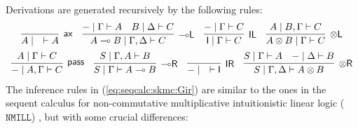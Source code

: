 \documentclass[sn-mathphys-num]{sn-jnl}%
\newcommand{\vd}{\vdash}
\newcommand{\tl}{\otimes \mathsf{L}}
\newcommand{\tr}{\otimes\mathsf{R}}
\newcommand{\pass}{\mathsf{pass}}
\newcommand{\unitl}{\mathsf{IL}}
\newcommand{\unitr}{\mathsf{IR}}
\newcommand{\ax}{\mathsf{ax}}
\newcommand{\ot}{\otimes}
\newcommand{\lolli}{\multimap}
\newcommand{\lleft}{{\lolli}\mathsf{L}}
\newcommand{\lright}{{\lolli}\mathsf{R}}
\newcommand{\unit}{\mathsf{I}}
\newcommand{\NMILL}{$\mathtt{NMILL}$}
\theoremstyle{thmstyleone}%
\theoremstyle{thmstyletwo}%
\theoremstyle{thmstylethree}%
\begin{document}
Derivations are generated recursively by the following rules:
\begin{equation}\label{eq:seqcalc:skmc:Gir}
	  \begin{array}{c}
		\infer[\ax]{A \mid \quad \vd A}{}
		\quad
		\infer[\lleft]{A \lolli B \mid \Gamma , \Delta \vd C}{
		  {-} \mid \Gamma \vd A
		  &
		  B \mid \Delta \vd C
		}
		\quad
		\infer[\unitl]{\unit \mid \Gamma \vd C}{{-} \mid \Gamma \vd C}
		\quad
		\infer[\tl]{A \ot B \mid \Gamma \vd C}{A \mid B , \Gamma \vd C}
		\\[5pt]
    \infer[\pass]{{-} \mid A , \Gamma \vd C}{A \mid \Gamma \vd C}
		\quad
		\infer[\lright]{S \mid \Gamma \vd A \lolli B}{S \mid \Gamma , A \vd B}
		\quad
		\infer[\unitr]{{-} \mid \quad \vd \unit}{}
		\quad
		\infer[\tr]{S \mid \Gamma , \Delta \vd A \ot B}{
		  S \mid \Gamma \vd A
		  &
		  {-} \mid \Delta \vd B
		}
	  \end{array}
	\end{equation}
The inference rules in (\ref{eq:seqcalc:skmc:Gir}) are similar to the ones in the sequent calculus for non-commutative multiplicative intuitionistic linear logic (\NMILL) \cite{abrusci:noncommutative:1990}, but with some crucial differences: 
\end{document}
